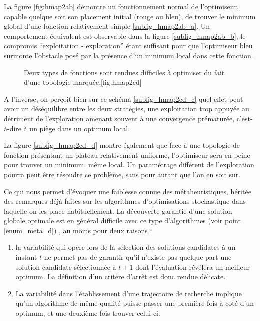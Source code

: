 La figure \ref{fig:hmap2ab} démontre un fonctionnement normal de l'optimiseur, capable quelque soit son placement initial (rouge ou bleu), de trouver le minimum global d'une fonction relativement simple \ref{subfig_hmap2ab_a}. Un comportement équivalent est observable dans la figure \ref{subfig_hmap2ab_b}, le compromis \enquote{exploitation - exploration} étant suffisant pour que l'optimiseur bleu surmonte l'obstacle posé par la présence d'un minimum local dans cette fonction.

\begin{figure}[!htbp]
  \begin{sidecaption}[fortoc]{Deux types de fonctions sont rendues difficiles à optimiser du fait d'une topologie marquée.}[fig:hmap2cd]
  \centering
  \qquad
 \end{sidecaption}
\end{figure}

A l'inverse, on perçoit bien sur ce schéma \ref{subfig_hmap2cd_c} quel effet peut avoir un déséquilibre entre les deux stratégies, une exploitation trop appuyée au détriment de l'exploration amenant souvent à une convergence  prématurée, c'est-à-dire à un piège dans un optimum local. 

La figure \ref{subfig_hmap2cd_d} montre également que face à une topologie de fonction présentant un plateau relativement uniforme, l'optimiseur sera en peine pour trouver un minimum, même local. Un paramétrage différent de l'exploration pourra peut être résoudre ce problème, sans pour autant que l'on en soit sur. 

Ce qui nous permet d'évoquer une faiblesse connue des métaheuristiques, héritée des remarques déjà faites sur les algorithmes d'optimisations stochastique  dans laquelle on les place habituellement. La découverte garantie d'une solution globale optimale est en général difficile avec ce type d'algorithmes (voir point \ref{enum_meta_d}) , au moins pour deux raisons : 

\begin{enumerate}
\item la variabilité qui opère lors de la selection des solutions candidates à un instant $t$ ne permet pas de garantir qu'il n'existe pas quelque part une solution candidate sélectionnée à $t+1$ dont l'évaluation révélera un meilleur optimum. La définition d'un critère d'arrêt est donc rendue délicate.
\item La variabilité dans l'établissement d'une trajectoire de recherche implique qu'un algorithme de même qualité puisse passer une première fois à coté d'un optimum, et une deuxième fois trouver celui-ci. 
\end{enumerate}

